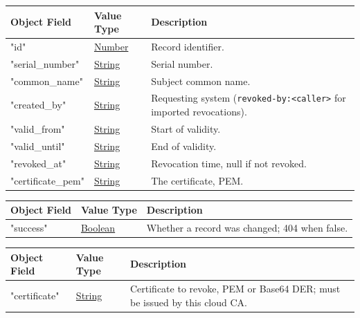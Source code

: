 \documentclass[a4paper]{arrowhead}
\newcommand{\pref}[1]{{\textcolor{ArrowheadGrey}{\hyperref[sec:model:primitives:#1]{#1}}}}
\begin{document}




\noindent\begin{tabularx}{\textwidth}{| >{\raggedright\arraybackslash}p{3.9cm} | >{\raggedright\arraybackslash\small}p{5.3cm} | X |} \hline
\rowcolor{gray!33} Object Field & Value Type & Description \\ \hline
"id" & \pref{Number} & Record identifier. \\ \hline
"serial\_number" & \pref{String} & Serial number. \\ \hline
"common\_name" & \pref{String} & Subject common name. \\ \hline
"created\_by" & \pref{String} & Requesting system (\texttt{revoked-\allowbreak{}by:\allowbreak{}\textless{}caller\textgreater{}} for imported revocations). \\ \hline
"valid\_from" & \pref{String} & Start of validity. \\ \hline
"valid\_until" & \pref{String} & End of validity. \\ \hline
"revoked\_at" & \pref{String} & Revocation time, null if not revoked. \\ \hline
"certificate\_pem" & \pref{String} & The certificate, PEM. \\ \hline
\end{tabularx}







\noindent\begin{tabularx}{\textwidth}{| >{\raggedright\arraybackslash}p{3.9cm} | >{\raggedright\arraybackslash\small}p{5.3cm} | X |} \hline
\rowcolor{gray!33} Object Field & Value Type & Description \\ \hline
"success" & \pref{Boolean} & Whether a record was changed; 404 when false. \\ \hline
\end{tabularx}







\noindent\begin{tabularx}{\textwidth}{| >{\raggedright\arraybackslash}p{3.9cm} | >{\raggedright\arraybackslash\small}p{5.3cm} | X |} \hline
\rowcolor{gray!33} Object Field & Value Type & Description \\ \hline
"certificate" & \pref{String} & Certificate to revoke, PEM or Base64 DER; must be issued by this cloud CA. \\ \hline
\end{tabularx}
\end{document}
